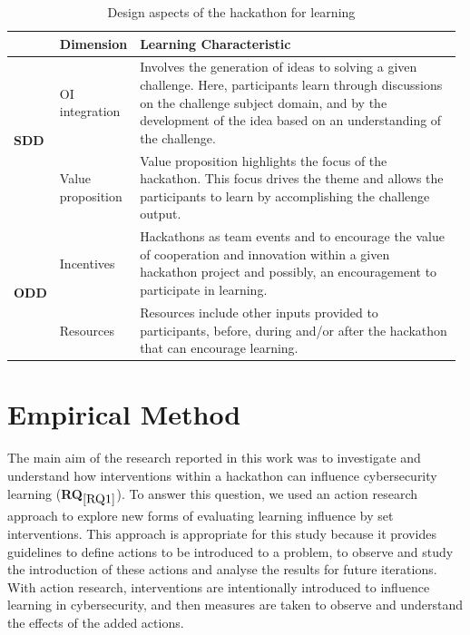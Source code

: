 \documentclass[runningheads]{llncs}
\newcommand{\hr}[1]{\textbf{RQ}$_{\ref{#1}}$}
\begin{document}
\begin{table}[h]
\caption{Design aspects of the hackathon for learning}
    \label{tab:designaspectforlearn}
\begin{tabular}{|p{0.08\linewidth}|p{0.14\linewidth}|p{0.76\linewidth}|} \hline	
    & Dimension & Learning Characteristic  \\ \hline
	\multirow{2}{*}{\textbf{SDD}} & OI \newline integration & Involves the generation of ideas to solving a given challenge. Here, participants learn through discussions on the challenge subject domain, and by the development of the idea based on an understanding of the challenge. \\ \cline{2-3}
    & Value \newline proposition & Value proposition highlights the focus of the hackathon. This focus drives the theme and allows the participants to learn by accomplishing the challenge output. \\ \hline
	\multirow{2}{*}{\textbf{ODD}} & Incentives & Hackathons as team events and to encourage the value of cooperation and innovation within a given hackathon project and possibly, an encouragement to participate in learning.  \\ \cline{2-3}
	& Resources & Resources include other inputs provided to participants, before, during and/or after the hackathon that can encourage learning. \\ \cline{2-3} \hline
\end{tabular}
\end{table}



\section{Empirical Method}

The main aim of the research reported in this work was to investigate and understand how interventions within a hackathon can influence cybersecurity learning (\hr{RQ1}). To answer this question, we used an action research approach \cite{bhattacherjee2012social,kaplan1998innovation} to explore new forms of evaluating learning influence by set interventions. This approach is appropriate for this study because it provides guidelines to define actions to be introduced to a problem, to observe and study the introduction of these actions and analyse the results for future iterations. With action research, interventions are intentionally introduced to influence learning in cybersecurity, and then measures are taken to observe and understand the effects of the added actions. 
\end{document}
